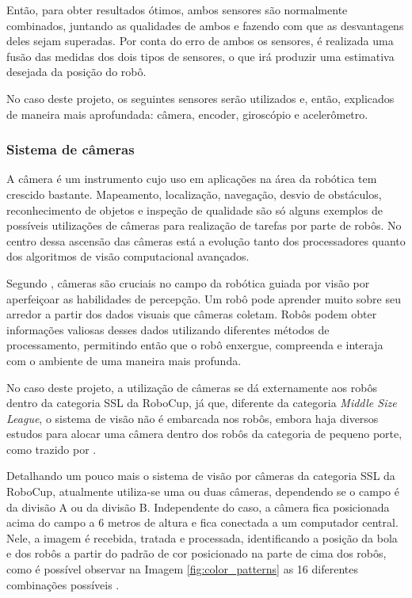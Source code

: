\documentclass[acronym, symbols]{fei}
\begin{document}
			Então, para obter resultados ótimos, ambos sensores são normalmente combinados, juntando as qualidades de ambos e fazendo com que as desvantagens deles sejam superadas. Por conta do erro de ambos os sensores, é realizada uma fusão das medidas dos dois tipos de sensores, o que irá produzir uma estimativa desejada da posição do robô.
			
			No caso deste projeto, os seguintes sensores serão utilizados e, então, explicados de maneira mais aprofundada: câmera, encoder, giroscópio e acelerômetro.
			
			\subsubsection{Sistema de câmeras}
			
				A câmera é um instrumento cujo uso em aplicações na área da robótica tem crescido bastante. Mapeamento, localização, navegação, desvio de obstáculos, reconhecimento de objetos e inspeção de qualidade são só alguns exemplos de possíveis utilizações de câmeras para realização de tarefas por parte de robôs. No centro dessa ascensão das câmeras está a evolução tanto dos processadores quanto dos algoritmos de visão computacional avançados.
				
				Segundo \textcite{cameras_technexion}, câmeras são cruciais no campo da robótica guiada por visão por aperfeiçoar as habilidades de percepção. Um robô pode aprender muito sobre seu arredor a partir dos dados visuais que câmeras coletam. Robôs podem obter informações valiosas desses dados utilizando diferentes métodos de processamento, permitindo então que o robô enxergue, compreenda e interaja com o ambiente de uma maneira mais profunda.
				
				No caso deste projeto, a utilização de câmeras se dá externamente aos robôs dentro da categoria SSL da RoboCup, já que, diferente da categoria \textit{Middle Size League}, o sistema de visão não é embarcada nos robôs, embora haja diversos estudos para alocar uma câmera dentro dos robôs da categoria de pequeno porte, como trazido por \textcite{melo2022embedded}.
				
				Detalhando um pouco mais o sistema de visão por câmeras da categoria SSL da RoboCup, atualmente utiliza-se uma ou duas câmeras, dependendo se o campo é da divisão A ou da divisão B. Independente do caso, a câmera fica posicionada acima do campo a 6 metros de altura e fica conectada a um computador central. Nele, a imagem é recebida, tratada e processada, identificando a posição da bola e dos robôs a partir do padrão de cor posicionado na parte de cima dos robôs, como é possível observar na Imagem \ref{fig:color_patterns} as 16 diferentes combinações possíveis \cite{10.1007/978-3-642-11876-0_37}.
				
\end{document}
